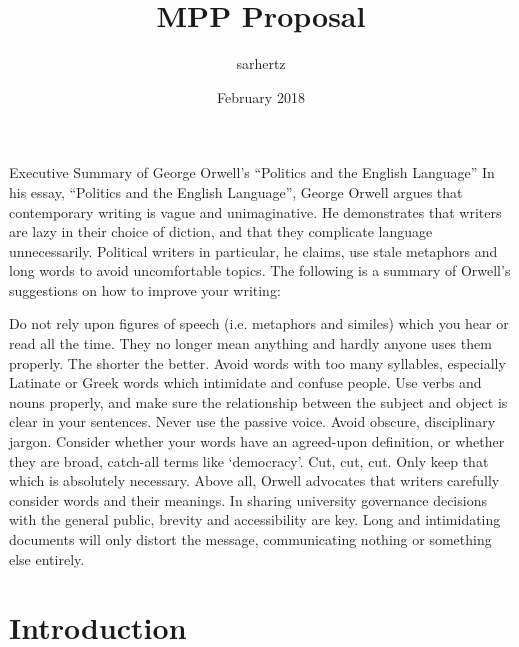 \documentclass{article}
\title{MPP Proposal}
\author{sarhertz }
\date{February 2018}
\begin{document}
Executive Summary of George Orwell’s “Politics and the English Language”				
In his essay, “Politics and the English Language”, George Orwell argues that contemporary writing is vague and unimaginative. He demonstrates that writers are lazy in their choice of diction, and that they complicate language unnecessarily. Political writers in particular, he claims, use stale metaphors and long words to avoid uncomfortable topics. The following is a summary of Orwell’s suggestions on how to improve your writing:

Do not rely upon figures of speech (i.e. metaphors and similes) which you hear or read all the time. They no longer mean anything and hardly anyone uses them properly.					 				
The shorter the better. Avoid words with too many syllables, especially Latinate or Greek words which intimidate and confuse people.	 	
Use verbs and nouns properly, and make sure the relationship between the subject and object is clear in your sentences. Never use the passive voice.
Avoid obscure, disciplinary jargon. Consider whether your words have an agreed-upon definition, or whether they are broad, catch-all terms like ‘democracy’.
Cut, cut, cut. Only keep that which is absolutely necessary.					 						
Above all, Orwell advocates that writers carefully consider words and their meanings. In sharing university governance decisions with the general public, brevity and accessibility are key. Long and intimidating documents will only distort the message, communicating nothing or something else entirely.


\maketitle

\section{Introduction}
\end{document}
